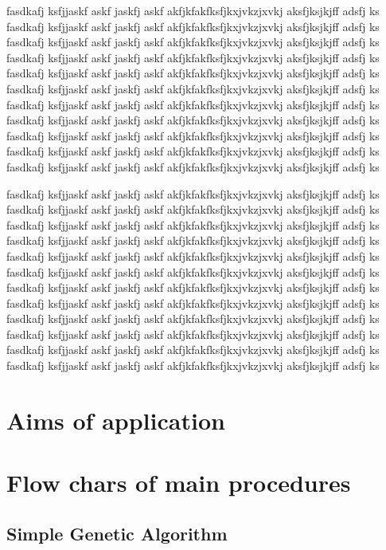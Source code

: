 \documentclass[a4paper,11pt,twocolumn]{article}
\begin{document}
fasdkafj ksfjjaskf askf jaskfj askf akfjkfakfksfjkxjvkzjxvkj aksfjksjkjff adsfj ks
fasdkafj ksfjjaskf askf jaskfj askf akfjkfakfksfjkxjvkzjxvkj aksfjksjkjff adsfj ks
fasdkafj ksfjjaskf askf jaskfj askf akfjkfakfksfjkxjvkzjxvkj aksfjksjkjff adsfj ks
fasdkafj ksfjjaskf askf jaskfj askf akfjkfakfksfjkxjvkzjxvkj aksfjksjkjff adsfj ks
fasdkafj ksfjjaskf askf jaskfj askf akfjkfakfksfjkxjvkzjxvkj aksfjksjkjff adsfj ks
fasdkafj ksfjjaskf askf jaskfj askf akfjkfakfksfjkxjvkzjxvkj aksfjksjkjff adsfj ks
fasdkafj ksfjjaskf askf jaskfj askf akfjkfakfksfjkxjvkzjxvkj aksfjksjkjff adsfj ks
fasdkafj ksfjjaskf askf jaskfj askf akfjkfakfksfjkxjvkzjxvkj aksfjksjkjff adsfj ks
fasdkafj ksfjjaskf askf jaskfj askf akfjkfakfksfjkxjvkzjxvkj aksfjksjkjff adsfj ks
fasdkafj ksfjjaskf askf jaskfj askf akfjkfakfksfjkxjvkzjxvkj aksfjksjkjff adsfj ks
fasdkafj ksfjjaskf askf jaskfj askf akfjkfakfksfjkxjvkzjxvkj aksfjksjkjff adsfj ks

fasdkafj ksfjjaskf askf jaskfj askf akfjkfakfksfjkxjvkzjxvkj aksfjksjkjff adsfj ks
fasdkafj ksfjjaskf askf jaskfj askf akfjkfakfksfjkxjvkzjxvkj aksfjksjkjff adsfj ks
fasdkafj ksfjjaskf askf jaskfj askf akfjkfakfksfjkxjvkzjxvkj aksfjksjkjff adsfj ks
fasdkafj ksfjjaskf askf jaskfj askf akfjkfakfksfjkxjvkzjxvkj aksfjksjkjff adsfj ks
fasdkafj ksfjjaskf askf jaskfj askf akfjkfakfksfjkxjvkzjxvkj aksfjksjkjff adsfj ks
fasdkafj ksfjjaskf askf jaskfj askf akfjkfakfksfjkxjvkzjxvkj aksfjksjkjff adsfj ks
fasdkafj ksfjjaskf askf jaskfj askf akfjkfakfksfjkxjvkzjxvkj aksfjksjkjff adsfj ks
fasdkafj ksfjjaskf askf jaskfj askf akfjkfakfksfjkxjvkzjxvkj aksfjksjkjff adsfj ks
fasdkafj ksfjjaskf askf jaskfj askf akfjkfakfksfjkxjvkzjxvkj aksfjksjkjff adsfj ks
fasdkafj ksfjjaskf askf jaskfj askf akfjkfakfksfjkxjvkzjxvkj aksfjksjkjff adsfj ks
fasdkafj ksfjjaskf askf jaskfj askf akfjkfakfksfjkxjvkzjxvkj aksfjksjkjff adsfj ks
fasdkafj ksfjjaskf askf jaskfj askf akfjkfakfksfjkxjvkzjxvkj aksfjksjkjff adsfj ks

\section{Aims of application}


\section{Flow chars of main procedures}

\subsection{Simple Genetic Algorithm}
\end{document}

